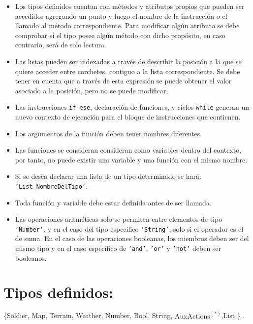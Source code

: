 \documentclass[twoside]{article}
\begin{document}
\begin{itemize}
			\item Los tipos definidos cuentan con m\'etodos y atributos propios que pueden ser accedidos agregando un punto y luego el nombre de la instrucción o el llamado al m\'etodo correspondiente. Para modificar alg\'un atributo se debe comprobar si el tipo posee alg\'un método con dicho prop\'osito, en caso contrario, ser\'a de solo lectura.
			
			\item Las listas pueden ser indexadas a trav\'es de describir la posici\'on a la que se quiere acceder entre corchetes, contiguo a la lista correspondiente. Se debe tener en cuenta que a trav\'es de esta expresi\'on se puede obtener el valor asociado a la posici\'on, pero no se puede modificar.
			
			\item Las instrucciones \texttt{if-ese}, declaraci\'on de funciones, y ciclos \texttt{while} generan un nuevo contexto de ejecuci\'on para el bloque de instrucciones que contienen.
			
			\item Los argumentos de la funci\'on deben tener nombres diferentes
			
			\item Las funciones se consideran consideran como variables dentro del contexto, por tanto, no puede existir una variable y una funci\'on con el mismo nombre.
			
			\item Si se desea declarar una lista de un tipo determinado se har\'a: \texttt{'List\_NombreDelTipo'}.
			
			\item Toda funci\'on y variable debe estar definida antes de  ser llamada.
			
			\item Las operaciones aritm\'eticas solo se permiten entre elementos de tipo \texttt{'Number'}, y en el caso del tipo espec\'ifico \texttt{'String'}, solo si el operador es el de suma. En el caso de las operaciones booleanas, los miembros deben ser del mismo tipo y en el caso espec\'ifico de \texttt{'and'}, \texttt{'or'} y \texttt{'not'} deben ser booleanos.
		\end{itemize}
		\section{Tipos definidos:}
		\{Soldier, Map, Terrain, Weather, Number, Bool, String, $\text{AuxActions}^{(*)}$,List \} .\\\vspace{0.1 cm}
		
\end{document}
